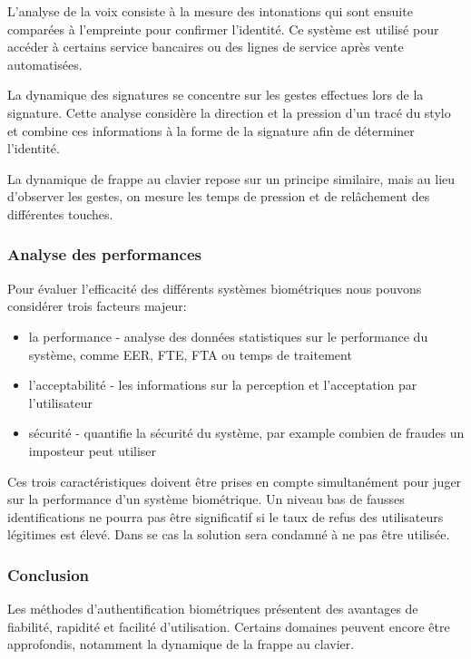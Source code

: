 L'analyse de la voix consiste à la mesure des intonations qui sont ensuite comparées à l'empreinte pour confirmer l'identité. Ce système est utilisé pour accéder à certains service bancaires ou des lignes de service après vente automatisées.

La dynamique des signatures se concentre sur les gestes effectues lors de la signature. Cette analyse considère la direction et la pression d'un tracé du stylo et combine ces informations à la forme de la signature afin de déterminer l'identité.

La dynamique de frappe au clavier repose sur un principe similaire, mais au lieu d'observer les gestes, on mesure les temps de pression et de relâchement des différentes touches.

\subsubsection{Analyse des performances}

Pour évaluer l'efficacité des différents systèmes biométriques nous pouvons considérer trois facteurs majeur:

\begin{itemize}
\item la performance - analyse des données statistiques sur le performance du système, comme EER, FTE, FTA ou temps de traitement
\item l'acceptabilité - les informations sur la perception et l'acceptation par l'utilisateur 
\item sécurité - quantifie la sécurité du système, par example combien de fraudes un imposteur peut utiliser
\end{itemize}

Ces trois caractéristiques doivent être prises en compte simultanément pour juger sur la performance d'un système biométrique. Un niveau bas de fausses identifications ne pourra pas être significatif si le taux de refus des utilisateurs légitimes est élevé. Dans se cas la solution sera condamné à ne pas être utilisée.

\subsubsection{Conclusion}

Les méthodes d'authentification biométriques présentent des avantages de fiabilité, rapidité et facilité d'utilisation. Certains domaines peuvent encore être approfondis, notamment la dynamique de la frappe au clavier.




